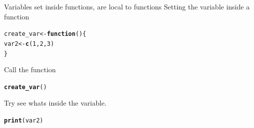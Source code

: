 \documentclass{beamer}\usepackage[]{graphicx}\usepackage[]{color}
\makeatletter
\newcommand{\hlnum}[1]{\textcolor[rgb]{0.686,0.059,0.569}{#1}}%
\newcommand{\hlstd}[1]{\textcolor[rgb]{0.345,0.345,0.345}{#1}}%
\newcommand{\hlkwa}[1]{\textcolor[rgb]{0.161,0.373,0.58}{\textbf{#1}}}%
\newcommand{\hlkwb}[1]{\textcolor[rgb]{0.69,0.353,0.396}{#1}}%
\newcommand{\hlkwd}[1]{\textcolor[rgb]{0.737,0.353,0.396}{\textbf{#1}}}%
\newenvironment{kframe}{%
 \def\at@end@of@kframe{}%
 \ifinner\ifhmode%
  \def\at@end@of@kframe{\end{minipage}}%
  \begin{minipage}{\columnwidth}%
 \fi\fi%
 \def\FrameCommand##1{\hskip\@totalleftmargin \hskip-\fboxsep
 \colorbox{shadecolor}{##1}\hskip-\fboxsep
     \hskip-\linewidth \hskip-\@totalleftmargin \hskip\columnwidth}%
 \MakeFramed {\advance\hsize-\width
   \@totalleftmargin\z@ \linewidth\hsize
   \@setminipage}}%
 {\par\unskip\endMakeFramed%
 \at@end@of@kframe}
\newenvironment{knitrout}{}{} %
\makeatother
\begin{document}
\begin{frame}[fragile]{Variables set inside functions, are local to functions}
Setting the variable inside a function
\begin{knitrout}
\color{fgcolor}\begin{kframe}
\begin{alltt}
\hlstd{create_var} \hlkwb{<-} \hlkwa{function}\hlstd{() \{}
    \hlstd{var2} \hlkwb{<-} \hlkwd{c}\hlstd{(}\hlnum{1}\hlstd{,} \hlnum{2}\hlstd{,} \hlnum{3}\hlstd{)}
\hlstd{\}}
\end{alltt}
\end{kframe}
\end{knitrout}

Call the function
\begin{knitrout}
\color{fgcolor}\begin{kframe}
\begin{alltt}
\hlkwd{create_var}\hlstd{()}
\end{alltt}
\end{kframe}
\end{knitrout}

Try see whats inside the variable.
\begin{knitrout}
\color{fgcolor}\begin{kframe}
\begin{alltt}
\hlkwd{print}\hlstd{(var2)}
\end{alltt}


{\ttfamily\noindent\bfseries\color{errorcolor}{\#\# Error: object 'var2' not found}}\end{kframe}
\end{knitrout}

\end{frame}
\end{document}
